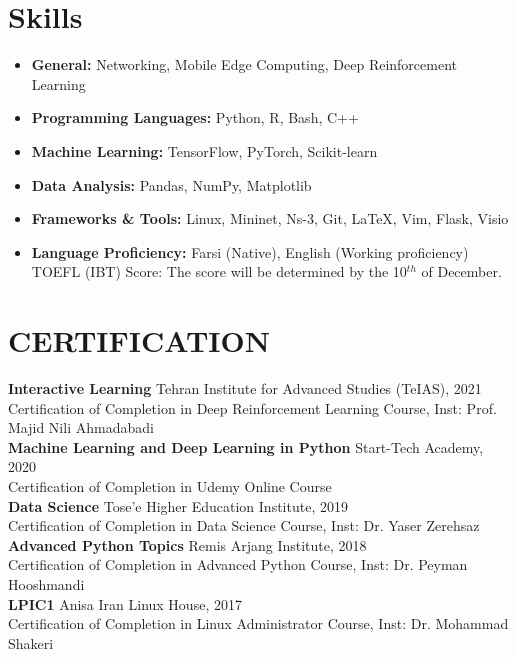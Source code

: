 \documentclass[11pt]{article}
\begin{document}
\section{Skills}



\begin{itemize}[noitemsep,topsep=0pt,parsep=0pt,partopsep=0pt]
	\item {\textbf{General:} Networking, Mobile Edge Computing, Deep Reinforcement Learning}\vspace{1mm}
	\item {\textbf{Programming Languages:} Python, R, Bash, C++}\vspace{1mm}
	\item {\textbf{Machine Learning:} TensorFlow, PyTorch, Scikit-learn}\vspace{1mm}
	\item {\textbf{Data Analysis:} Pandas, NumPy, Matplotlib}\vspace{1mm}
	\item {\textbf{Frameworks \& Tools:} Linux, Mininet, Ns-3, Git, \LaTeX, Vim, Flask, Visio}\vspace{1mm}
	\item {\textbf{Language Proficiency:} Farsi (Native), English (Working proficiency)}\vspace{1mm}\\
    TOEFL (IBT) Score: The score will be determined by the 10$^{th}$ of December.

\end{itemize}


\section{CERTIFICATION}  

\textbf{Interactive Learning}  \hfill Tehran Institute for Advanced Studies (TeIAS), 2021\\
Certification of Completion in Deep Reinforcement Learning Course, Inst: Prof. Majid Nili Ahmadabadi	\href{https://scholar.google.com/citations?user=QlwWxmoAAAAJ&hl=en}{\small \faExternalLink}\\
\textbf{Machine Learning and Deep Learning in Python}  \hfill Start-Tech Academy, 2020\\
Certification of Completion in Udemy Online Course\\
\textbf{Data Science} \hfill Tose’e Higher Education Institute, 2019\\
Certification of Completion in Data Science Course, Inst: Dr. Yaser Zerehsaz \href{https://scholar.google.com/citations?user=QlwWxmoAAAAJ&hl=en}{\small \faExternalLink}\\
\textbf{Advanced Python Topics} \hfill Remis Arjang Institute, 2018\\
Certification of Completion in Advanced Python Course, Inst: Dr. Peyman Hooshmandi\\
\textbf{LPIC1} \hfill Anisa Iran Linux House, 2017\\
Certification of Completion in Linux Administrator Course, Inst: Dr. Mohammad Shakeri 
\end{document}
